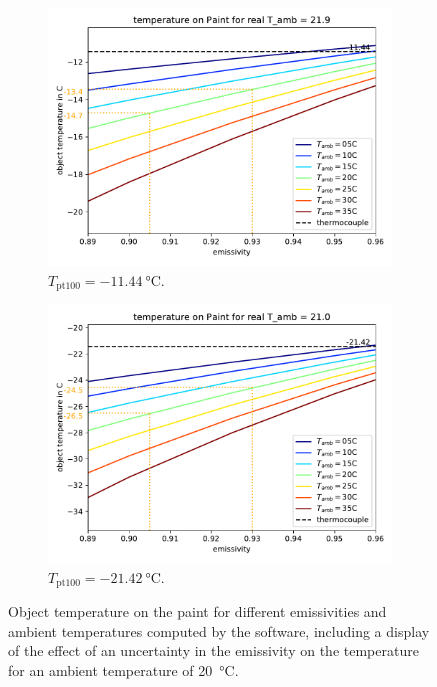\begin{figure}[h!]
	\centering
	\begin{subfigure}{0.7\textwidth}
		\includegraphics[width=\textwidth]{img/softwarePaint-10.pdf}
		\caption{$T_\text{pt100} = \SI{-11.44}{\degreeCelsius}$.}
		\label{fig:softwarePaint-10}
	\end{subfigure}
	\begin{subfigure}{0.7\textwidth}
		\includegraphics[width=\textwidth]{img/softwarePaint-20.pdf}
		\caption{$T_\text{pt100} = \SI{-21.42}{\degreeCelsius}$.}
		\label{fig:softwarePaint-20}
	\end{subfigure}
	\caption{Object temperature on the paint for different emissivities and ambient temperatures computed by the software, including a display of the effect of an uncertainty in the emissivity on the temperature for an ambient temperature of \SI{20}{\degreeCelsius}.}
	\label{fig:softwarePaint}
\end{figure}